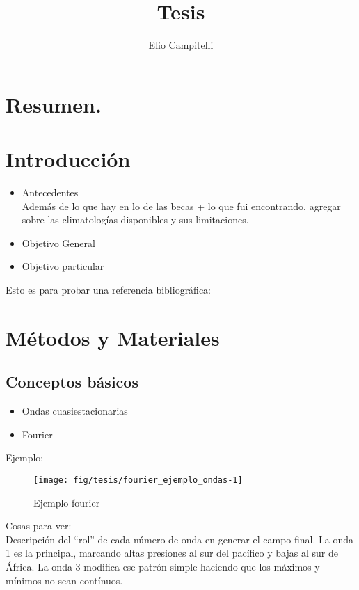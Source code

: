 \documentclass[es-AR,]{tufte-book}
\title{Tesis}
\author{Elio Campitelli}
\providecommand{\tightlist}{%
  \setlength{\itemsep}{0pt}\setlength{\parskip}{0pt}}
\begin{document}
\maketitle



{
\setcounter{tocdepth}{3}
\tableofcontents
}

\chapter{Resumen.}\label{resumen.}

\chapter{Introducción}\label{introduccion}

\begin{itemize}
\tightlist
\item
  Antecedentes\\
  Además de lo que hay en lo de las becas + lo que fui encontrando,
  agregar sobre las climatologías disponibles y sus limitaciones.
\item
  Objetivo General
\item
  Objetivo particular
\end{itemize}

Esto es para probar una referencia bibliográfica: \citet{Vera2004}

\chapter{Métodos y Materiales}\label{metodos-y-materiales}

\section{Conceptos básicos}\label{conceptos-basicos}

\begin{itemize}
\tightlist
\item
  Ondas cuasiestacionarias
\item
  Fourier
\end{itemize}

Ejemplo:

\begin{figure}
\texttt{[image: fig/tesis/fourier\_ejemplo\_ondas-1]} \caption[Ejemplo fourier]{Ejemplo fourier}\label{fig:fourier_ejemplo_ondas}
\end{figure}

Cosas para ver:\\
Descripción del ``rol'' de cada número de onda en generar el campo
final. La onda 1 es la principal, marcando altas presiones al sur del
pacífico y bajas al sur de África. La onda 3 modifica ese patrón simple
haciendo que los máximos y mínimos no sean contínuos.
\end{document}

